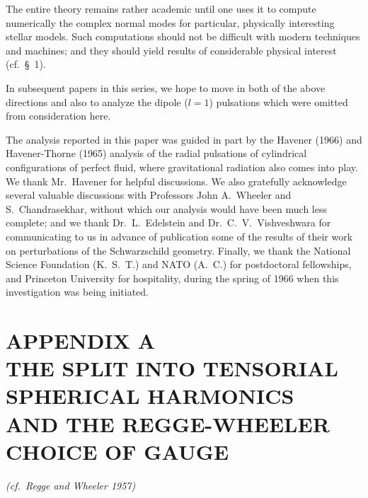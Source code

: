 \documentclass[12pt]{article}
\begin{document}
The entire theory remains rather academic until one uses it to compute numerically
the complex normal modes for particular, physically interesting stellar models. Such
computations should not be difficult with modern techniques and machines; and they
should yield results of considerable physical interest (cf.\ \S~1).

In subsequent papers in this series, we hope to move in both of the above directions
and also to analyze the dipole ($l = 1$) pulsations which were omitted from consideration
here.

The analysis reported in this paper was guided in part by the Havener (1966) and
Havener-Thorne (1965) analysis of the radial pulsations of cylindrical configurations of
perfect fluid, where gravitational radiation also comes into play. We thank Mr.\ Havener
for helpful discussions. We also gratefully acknowledge several valuable discussions with
Professors John A.\ Wheeler and S.\ Chandrasekhar, without which our analysis would
have been much less complete; and we thank Dr.\ L.\ Edelstein and Dr.\ C.\ V.\ Vishvesh\-wara
for communicating to us in advance of publication some of the results of their
work on perturbations of the Schwarzschild geometry. Finally, we thank the National
Science Foundation (K.\ S.\ T.) and NATO (A.\ C.) for postdoctoral fellowships, and
Princeton University for hospitality, during the spring of 1966 when this investigation
was being initiated.

\appendix

\section*{APPENDIX A \\ THE SPLIT INTO TENSORIAL SPHERICAL HARMONICS \\ AND THE REGGE-WHEELER CHOICE OF GAUGE}

\textit{(cf.\ Regge and Wheeler 1957)}
\end{document}
